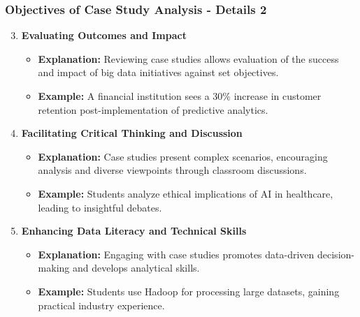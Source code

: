 \documentclass[aspectratio=169]{beamer}
\begin{document}
\begin{frame}[fragile]
    \frametitle{Objectives of Case Study Analysis - Details 2}
    \begin{enumerate}
        \setcounter{enumi}{2} %
        \item \textbf{Evaluating Outcomes and Impact}  
            \begin{itemize}
                \item \textbf{Explanation:} Reviewing case studies allows evaluation of the success and impact of big data initiatives against set objectives.
                \item \textbf{Example:} A financial institution sees a 30\% increase in customer retention post-implementation of predictive analytics.
            \end{itemize}

        \item \textbf{Facilitating Critical Thinking and Discussion}  
            \begin{itemize}
                \item \textbf{Explanation:} Case studies present complex scenarios, encouraging analysis and diverse viewpoints through classroom discussions.
                \item \textbf{Example:} Students analyze ethical implications of AI in healthcare, leading to insightful debates.
            \end{itemize}

        \item \textbf{Enhancing Data Literacy and Technical Skills}  
            \begin{itemize}
                \item \textbf{Explanation:} Engaging with case studies promotes data-driven decision-making and develops analytical skills.
                \item \textbf{Example:} Students use Hadoop for processing large datasets, gaining practical industry experience.
            \end{itemize}
    \end{enumerate}
\end{frame}
\end{document}
